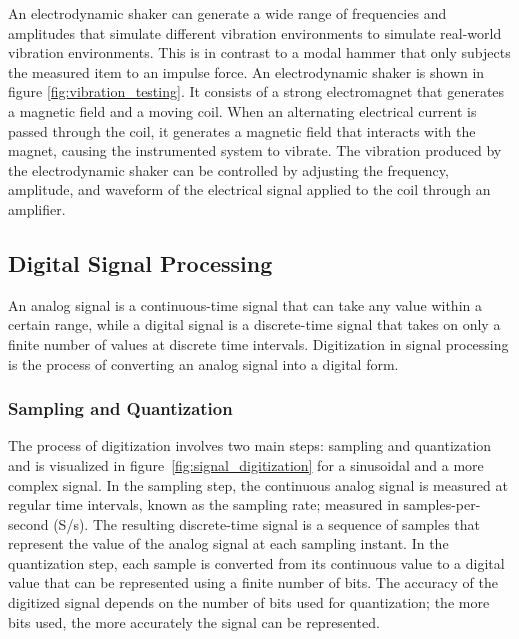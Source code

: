 \documentclass[12pt,letter]{article}
\begin{document}
An electrodynamic shaker can generate a wide range of frequencies and amplitudes that simulate different vibration environments to simulate real-world vibration environments. This is in contrast to a modal hammer that only subjects the measured item to an impulse force. An electrodynamic shaker is shown in figure \ref{fig:vibration_testing}. It consists of a strong electromagnet that generates a magnetic field and a moving coil. When an alternating electrical current is passed through the coil, it generates a magnetic field that interacts with the magnet, causing the instrumented system to vibrate. The vibration produced by the electrodynamic shaker can be controlled by adjusting the frequency, amplitude, and waveform of the electrical signal applied to the coil through an amplifier.



\subsection{Digital Signal Processing}

 An analog signal is a continuous-time signal that can take any value within a certain range, while a digital signal is a discrete-time signal that takes on only a finite number of values at discrete time intervals. Digitization in signal processing is the process of converting an analog signal into a digital form.

\subsubsection{Sampling and Quantization}


The process of digitization involves two main steps: sampling and quantization and is visualized in figure~\ref{fig:signal_digitization} for a sinusoidal and a more complex signal. In the sampling step, the continuous analog signal is measured at regular time intervals, known as the sampling rate; measured in samples-per-second (S/s). The resulting discrete-time signal is a sequence of samples that represent the value of the analog signal at each sampling instant. In the quantization step, each sample is converted from its continuous value to a digital value that can be represented using a finite number of bits. The accuracy of the digitized signal depends on the number of bits used for quantization; the more bits used, the more accurately the signal can be represented.
\end{document}
